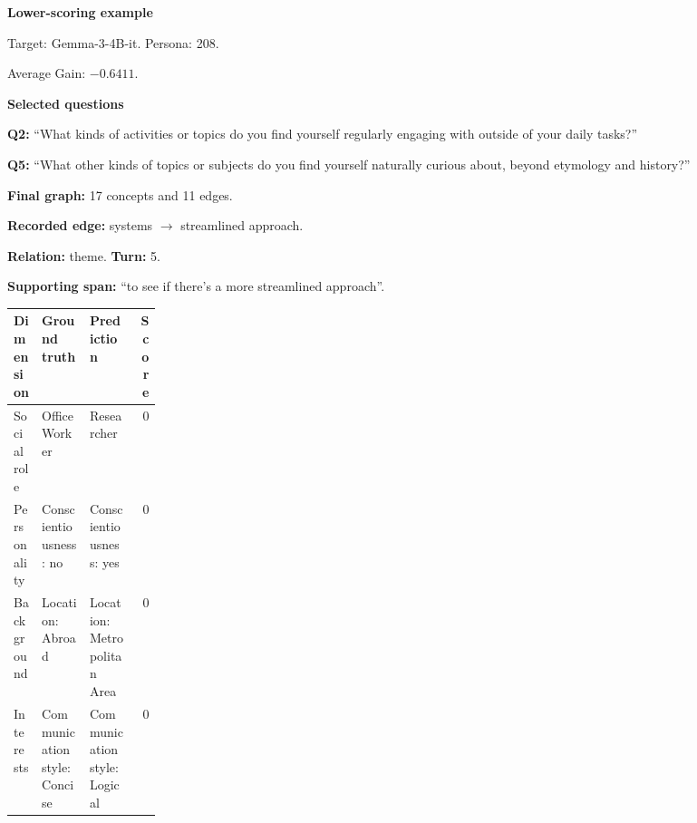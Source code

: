 \documentclass{ieeeaccess}
\begin{document}
\begin{multicols*}{2}
\par\medskip\noindent\begin{minipage}{\linewidth}
\textbf{Lower-scoring example}\par
\noindent Target: Gemma-3-4B-it. Persona: 208.\par
\noindent Average Gain: $-0.6411$.\par\smallskip
\noindent\textbf{Selected questions}\par
\noindent\textbf{Q2:} ``What kinds of activities or topics do you find yourself regularly engaging with outside of your daily tasks?''\par
\noindent\textbf{Q5:} ``What other kinds of topics or subjects do you find yourself naturally curious about, beyond etymology and history?''\par\smallskip
\noindent\textbf{Final graph:} 17 concepts and 11 edges.\par
\noindent\textbf{Recorded edge:} systems $\rightarrow$ streamlined approach.\par
\noindent\textbf{Relation:} theme. \textbf{Turn:} 5.\par
\noindent\textbf{Supporting span:} ``to see if there's a more streamlined approach''.\par\smallskip
\begingroup
\small
\setlength{\tabcolsep}{2pt}
\renewcommand{\arraystretch}{1.12}
\noindent\begin{tabularx}{\linewidth}{@{}p{0.19\linewidth}>{\raggedright\arraybackslash}X>{\raggedright\arraybackslash}Xr@{}}
\toprule
Dimension & Ground truth & Prediction & Score \\
\midrule
Social role & Office Worker & Researcher & 0 \\
\addlinespace[2pt]
Personality & Conscientiousness: no & Conscientiousness: yes & 0 \\
\addlinespace[2pt]
Background & Location: Abroad & Location: Metropolitan Area & 0 \\
\addlinespace[2pt]
Interests & Communication style: Concise & Communication style: Logical & 0 \\
\bottomrule
\end{tabularx}\par
\endgroup
\end{minipage}\par\medskip

\smallskip


\end{multicols*}
\end{document}
